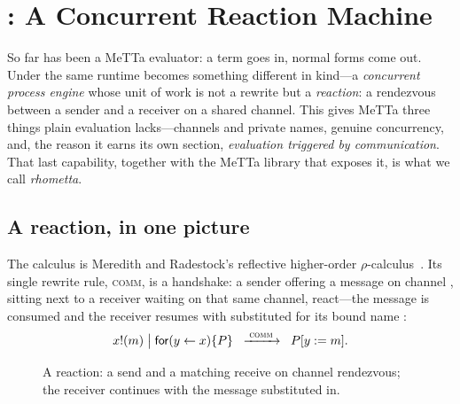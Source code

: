 
\section{\RhoCalc{}: A Concurrent Reaction Machine}
\label{sec:rhocalc}

So far \CeTTa{} has been a MeTTa evaluator: a term goes in, normal forms come
out.  Under  the same runtime becomes something different in
kind---a \emph{concurrent process engine} whose unit of work is not a rewrite but
a \emph{reaction}: a rendezvous between a sender and a receiver on a shared
channel.  This gives MeTTa three things plain evaluation lacks---channels and
private names, genuine concurrency, and, the reason it earns its own section,
\emph{evaluation triggered by communication}.  That last capability, together
with the MeTTa library that exposes it, is what we call \emph{rhometta}.

\subsection{A reaction, in one picture}

The calculus is Meredith and Radestock's reflective higher-order
$\rho$-calculus~\cite{rho2005}.  Its single rewrite rule, \textsc{comm}, is a
handshake: a sender  offering a message  on channel ,
sitting next to a receiver  waiting on that same channel,
react---the message is consumed and the receiver resumes with 
substituted for its bound name :
\[
  x!(m) \;\big|\; \mathsf{for}(y \leftarrow x)\{P\}
  \;\;\xrightarrow{\;\textsc{comm}\;}\;\; P[y := m].
\]

\begin{figure}[h]\centering
{}
\caption{A reaction: a send and a matching receive on channel  rendezvous;
  the receiver continues with the message substituted in.}
\end{figure}

